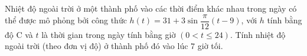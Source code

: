 \begin{ex}%
Nhiệt độ ngoài trời ở một thành phố vào các thời điểm khác nhau trong ngày có
thể được mô phỏng bởi công thức $h(t)=31+3\sin \dfrac{\pi}{12}(t-9)$, với $h$ tính bằng độ $\mathrm{C}$ và $t$ là thời gian trong ngày tính bằng giờ $(0<t\leq 24)$.
Tính nhiệt độ ngoài trời (theo đơn vị độ) ở thành phố đó vào lúc $7$ giờ tối. 
\end{ex}

